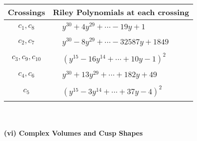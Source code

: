 \documentclass[1p]{elsarticle_modified}
\theoremstyle{definition}
\begin{document}
\begin{tabular}{m{50pt}|m{274pt}}
Crossings & \hspace{64pt}Riley Polynomials at each crossing \\
\hline $$\begin{aligned}c_{1},c_{8}\end{aligned}$$&$\begin{aligned}
&y^{30}+4 y^{29}+\cdots-19 y+1
\end{aligned}$\\
\hline $$\begin{aligned}c_{2},c_{7}\end{aligned}$$&$\begin{aligned}
&y^{30}-8 y^{29}+\cdots-32587 y+1849
\end{aligned}$\\
\hline $$\begin{aligned}c_{3},c_{9},c_{10}\end{aligned}$$&$\begin{aligned}
&(y^{15}-16 y^{14}+\cdots+10 y-1)^{2}
\end{aligned}$\\
\hline $$\begin{aligned}c_{4},c_{6}\end{aligned}$$&$\begin{aligned}
&y^{30}+13 y^{29}+\cdots+182 y+49
\end{aligned}$\\
\hline $$\begin{aligned}c_{5}\end{aligned}$$&$\begin{aligned}
&(y^{15}-3 y^{14}+\cdots+37 y-4)^{2}
\end{aligned}$\\
\hline
\end{tabular}\\~\\
\newpage\flushleft \textbf{(vi) Complex Volumes and Cusp Shapes}
\end{document}

